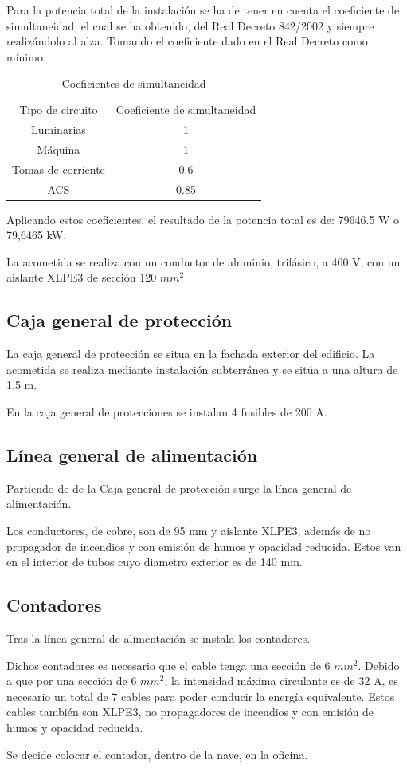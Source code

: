 \documentclass[../main.tex]{subfiles}
\begin{document}
Para la potencia total de la instalación se ha de tener en cuenta el coeficiente de simultaneidad, el cual se ha obtenido, del Real Decreto 842/2002 y siempre realizándolo al alza. Tomando el coeficiente dado en el Real Decreto como mínimo.

\begin{table}[H]
    \centering
    \begin{tabular}{c|c}
    Tipo de circuito & Coeficiente de simultaneidad \\
    Luminarias & 1 \\
    Máquina & 1 \\
    Tomas de corriente & 0.6 \\
    ACS & 0.85 \\
    \end{tabular}
    \caption{Coeficientes de simultaneidad}
\end{table}

Aplicando estos coeficientes, el resultado de la potencia total es de: 79646.5 W o 79,6465 kW.

La acometida se realiza con un conductor de aluminio, trifásico, a 400 V, con un aislante XLPE3 de sección 120 $mm^2$

\subsection{Caja general de protección}

La caja general de protección se situa en la fachada exterior del edificio. La acometida se realiza mediante instalación subterránea y se sitúa a una altura de 1.5 m. 

En la caja general de protecciones se instalan 4 fusibles de 200 A. 

\subsection{Línea general de alimentación}

Partiendo de de la Caja general de protección surge la línea general de alimentación.

Los conductores, de cobre, son de 95 mm y aislante XLPE3, además de no propagador de incendios y con emisión de humos y opacidad reducida. Estos van en el interior de tubos cuyo diametro exterior es de 140 mm.

\subsection{Contadores}

Tras la línea general de alimentación se instala los contadores. 

Dichos contadores es necesario que el cable tenga una sección de 6 $mm^2$. Debido a que por una sección de 6 $mm^2$, la intensidad máxima circulante es de 32 A, es necesario un total de 7 cables para poder conducir la energía equivalente. Estos cables también son XLPE3, no propagadores de incendios y con emisión de humos y opacidad reducida.

Se decide colocar el contador, dentro de la nave, en la oficina. 
\end{document}

